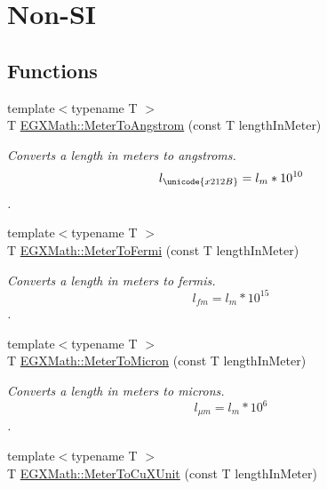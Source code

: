 \hypertarget{group___e_g_x_math-_conversions-_length_conversions-_meter-_non-_s_i}{}\section{Non-\/\+SI}
\label{group___e_g_x_math-_conversions-_length_conversions-_meter-_non-_s_i}
\subsection*{Functions}
\begin{DoxyCompactItemize}
\item 
{\footnotesize template$<$typename T $>$ }\\T \mbox{\hyperlink{group___e_g_x_math-_conversions-_length_conversions-_meter-_non-_s_i_ga9e6d5040f58d167bd7a4b6cebb5527ee}{E\+G\+X\+Math\+::\+Meter\+To\+Angstrom}} (const T length\+In\+Meter)
\begin{DoxyCompactList}\small\item\em Converts a length in meters to angstroms. \[ l_{\unicode{x212B}}=l_{m} * 10^{10} \]. \end{DoxyCompactList}\item 
{\footnotesize template$<$typename T $>$ }\\T \mbox{\hyperlink{group___e_g_x_math-_conversions-_length_conversions-_meter-_non-_s_i_ga2cf89a4a80da02e3e3c82e844095acfe}{E\+G\+X\+Math\+::\+Meter\+To\+Fermi}} (const T length\+In\+Meter)
\begin{DoxyCompactList}\small\item\em Converts a length in meters to fermis. \[ l_{fm}=l_{m} * 10^{15} \]. \end{DoxyCompactList}\item 
{\footnotesize template$<$typename T $>$ }\\T \mbox{\hyperlink{group___e_g_x_math-_conversions-_length_conversions-_meter-_non-_s_i_ga9655833d43ede59b17c54a6f06f9681a}{E\+G\+X\+Math\+::\+Meter\+To\+Micron}} (const T length\+In\+Meter)
\begin{DoxyCompactList}\small\item\em Converts a length in meters to microns. \[ l_{\mu m}=l_{m} * 10^{6} \]. \end{DoxyCompactList}\item 
{\footnotesize template$<$typename T $>$ }\\T \mbox{\hyperlink{group___e_g_x_math-_conversions-_length_conversions-_meter-_non-_s_i_ga67cec26b74704753fc51a8f4db27a4b4}{E\+G\+X\+Math\+::\+Meter\+To\+Cu\+X\+Unit}} (const T length\+In\+Meter)

\end{DoxyCompactItemize}
